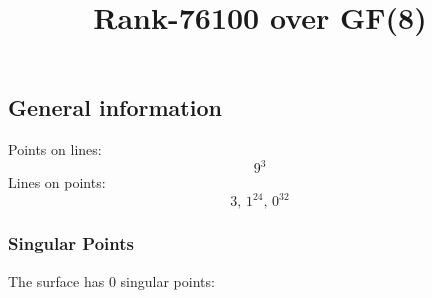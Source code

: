 \documentclass{article}
\newcommand\setTBstruts{\def\T{\rule{0pt}{2.6ex}}%
\def\B{\rule[-1.2ex]{0pt}{0pt}}}
\begin{document}
 
\setTBstruts



{\allowdisplaybreaks%






\title{Rank-76100 over GF(8)}
\author{}%
\maketitle%
%
{}



\subsection*{General information}
Points on lines:
$$
9^3$$
Lines on points:
$$
3,\,1^{24},\,0^{32}$$
\subsubsection*{Singular Points}
The surface has 0 singular points:\\
\begin{align*}
\end{align*}
}
\end{document}
